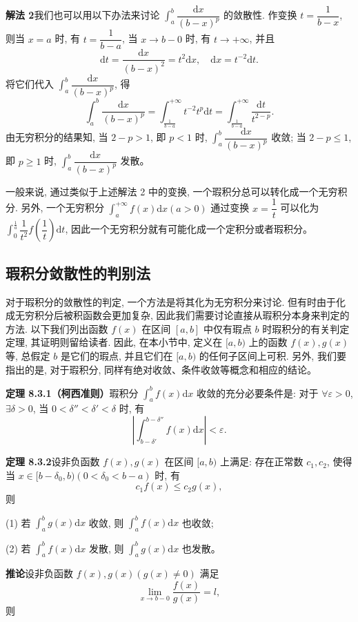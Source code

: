 \documentclass[UTF8, 12pt, fontset=fandol, oneside]{ctexart}
\begin{document}
\noindent\textbf{解法 2}\quad 我们也可以用以下办法来讨论 $\int_a^b\dfrac{\mathrm dx}{(b-x)^p}$ 的敛散性. 作变换 $t=\dfrac1{b-x}$, 则当 $x=a$ 时, 有 $t=\dfrac1{b-a}$, 当 $x\to b-0$ 时, 有 $t\to+\infty$, 并且
\[
  \mathrm dt=\frac{\mathrm dx}{(b-x)^2}=t^2\mathrm dx,\quad
  \mathrm dx=t^{-2}\mathrm dt.
\]
将它们代入 $\int_a^b\dfrac{\mathrm dx}{(b-x)^p}$, 得
\[
  \int_a^b\frac{\mathrm dx}{(b-x)^p}
  =
  \int_{\frac1{b-a}}^{+\infty}t^{-2}t^p\mathrm dt
  =
  \int_{\frac1{b-a}}^{+\infty}\frac{\mathrm dt}{t^{2-p}}.
\]
由无穷积分的结果知, 当 $2-p>1$, 即 $p<1$ 时, $\int_a^b\dfrac{\mathrm dx}{(b-x)^p}$ 收敛; 当 $2-p\leq1$, 即 $p\geq1$ 时, $\int_a^b\dfrac{\mathrm dx}{(b-x)^p}$ 发散。

一般来说, 通过类似于上述解法 2 中的变换, 一个瑕积分总可以转化成一个无穷积分. 另外, 一个无穷积分 $\int_a^{+\infty}f(x)\mathrm dx(a>0)$ 通过变换 $x=\dfrac1t$ 可以化为 $\int_0^{\frac1a}\dfrac1{t^2}f\left(\dfrac1t\right)\mathrm dt$, 因此一个无穷积分就有可能化成一个定积分或者瑕积分。

\subsection{瑕积分敛散性的判别法}

对于瑕积分的敛散性的判定, 一个方法是将其化为无穷积分来讨论. 但有时由于化成无穷积分后被积函数会更加复杂, 因此我们需要讨论直接从瑕积分本身来判定的方法. 以下我们列出函数 $f(x)$ 在区间 $[a,b]$ 中仅有瑕点 $b$ 时瑕积分的有关判定定理, 其证明则留给读者. 因此, 在本小节中, 定义在 $[a,b)$ 上的函数 $f(x),g(x)$ 等, 总假定 $b$ 是它们的瑕点, 并且它们在 $[a,b)$ 的任何子区间上可积. 另外, 我们要指出的是, 对于瑕积分, 同样有绝对收敛、条件收敛等概念和相应的结论。

\noindent\textbf{定理 8.3.1（柯西准则）}\quad 瑕积分 $\int_a^b f(x)\mathrm dx$ 收敛的充分必要条件是: 对于 $\forall\varepsilon>0$, $\exists\delta>0$, 当 $0<\delta''<\delta'<\delta$ 时, 有
\[
  \left|\int_{b-\delta'}^{b-\delta''}f(x)\mathrm dx\right|<\varepsilon.
\]

\noindent\textbf{定理 8.3.2}\quad 设非负函数 $f(x),g(x)$ 在区间 $[a,b)$ 上满足: 存在正常数 $c_1,c_2$, 使得当 $x\in[b-\delta_0,b)(0<\delta_0<b-a)$ 时, 有
\[
  c_1f(x)\leq c_2g(x),
\]
则

(1) 若 $\int_a^b g(x)\mathrm dx$ 收敛, 则 $\int_a^b f(x)\mathrm dx$ 也收敛;

(2) 若 $\int_a^b f(x)\mathrm dx$ 发散, 则 $\int_a^b g(x)\mathrm dx$ 也发散。

\noindent\textbf{推论}\quad 设非负函数 $f(x),g(x)(g(x)\ne0)$ 满足
\[
  \lim_{x\to b-0}\frac{f(x)}{g(x)}=l,
\]
则
\end{document}
